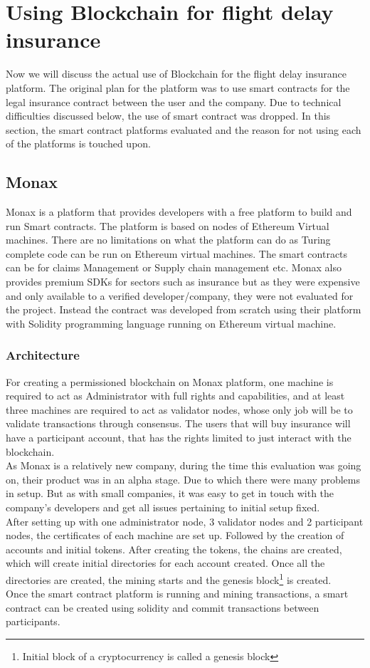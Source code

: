 \section{Using Blockchain for flight delay insurance}
Now we will discuss the actual use of Blockchain for the flight delay insurance platform. The original plan for the platform was to use smart contracts for the legal insurance contract between the user and the company. Due to technical difficulties discussed below, the use of smart contract was dropped. In this section, the smart contract platforms evaluated and the reason for not using each of the platforms is touched upon.

\subsection{Monax}
Monax is a platform that provides developers with a free platform to build and run Smart contracts. The platform is based on nodes of Ethereum Virtual machines. There are no limitations on what the platform can do as Turing complete code can be run on Ethereum virtual machines. The smart contracts can be for claims Management or Supply chain management etc. Monax also provides premium SDKs for sectors such as insurance but as they were expensive and only available to a verified developer/company, they were not evaluated for the project. Instead the contract was developed from scratch using their platform with Solidity programming language running on Ethereum virtual machine. 
\subsubsection{Architecture}
For creating a permissioned blockchain on Monax platform, one machine is  required to act as Administrator with full rights and capabilities, and at least three machines are required to act as validator nodes, whose only job will be to validate transactions through consensus. The users that will buy insurance will have a participant account, that has the rights limited to just interact with the blockchain.
\\As Monax is a relatively new company, during the time this evaluation was going on, their product was in an alpha stage. Due to which there were many problems in setup. But as with small companies, it was easy to get in touch with the company's developers and get all  issues pertaining to initial setup fixed. 
\\After setting up with one administrator node, 3 validator nodes and 2 participant nodes, the certificates of each machine are set up. Followed by the creation of accounts and initial tokens. After creating the tokens, the chains are created, which will create initial directories for each account created. Once all the directories are created, the mining starts and the genesis block\footnote{Initial block of a cryptocurrency is called a genesis block} is created.
\\Once the smart contract platform is running and mining transactions, a smart contract can be created using solidity and commit transactions between participants.

